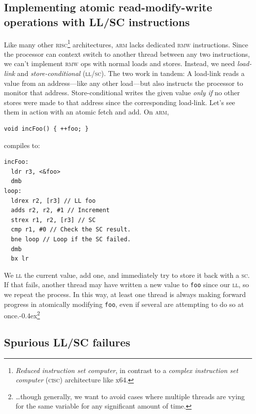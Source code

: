 \documentclass[fontsize=10pt, numbers=endperiod]{scrartcl}
\newcommand{\codesize}{\fontsize{10pt}{12pt}}
\newcommand{\punckern}{\kern-0.4ex}
\newcommand{\introduce}[1]{\textit{#1}}
\newenvironment{colfigure}
  {\par\vspace{1\baselineskip minus 0.5\baselineskip}\noindent\minipage{\linewidth}}
  {\endminipage\vspace*{1\baselineskip minus 0.7\baselineskip}}
\begin{document}
\begin{multicols}{2}
\section{Implementing atomic read-modify-write operations with LL/SC instructions}

Like many other
\textsc{risc}\footnote{\introduce{Reduced instruction set computer},
in contrast to a \introduce{complex instruction set computer} \textsc{(cisc)}
architecture like x64.}
architectures, \textsc{arm} lacks dedicated \textsc{rmw} instructions.
Since the processor can context switch to another thread
between any two instructions,
we can't implement \textsc{rmw} ops with normal loads and stores.
Instead, we need
\introduce{load-link} and \introduce{store-conditional} \textsc{(ll/sc)}.
The two work in tandem:
A load-link reads a value from an address---like any other load---but also
instructs the processor to monitor that address.
Store-conditional writes the given value \emph{only if}
no other stores were made to that address
since the corresponding load-link.
Let's see them in action with an atomic fetch and add.
On \textsc{arm},
\begin{colfigure}
\begin{verbatim}
void incFoo() { ++foo; }
\end{verbatim}
compiles to:
\begin{lstlisting}[language={[ARM]Assembler}]
incFoo:
  ldr r3, <&foo>
  dmb
loop:
  ldrex r2, [r3] // LL foo
  adds r2, r2, #1 // Increment
  strex r1, r2, [r3] // SC
  cmp r1, #0 // Check the SC result.
  bne loop // Loop if the SC failed.
  dmb
  bx lr
\end{lstlisting}
\end{colfigure}
We \textsc{ll} the current value, add one, and immediately try to store it back
with a \textsc{sc}. If that fails, another thread may have
written a new value to \texttt{foo} since our \textsc{ll},
so we repeat the process.
In this way, at least one thread is always making forward progress in atomically
modifying \texttt{foo}, even if several are attempting to do so at
once.\punckern\footnote{\ldots though generally,
we want to avoid cases where multiple threads are vying for the same variable
for any significant amount of time.}

\subsection{Spurious LL/SC failures}
\label{spurious-ll/sc-failures}


\end{multicols}
\end{document}
